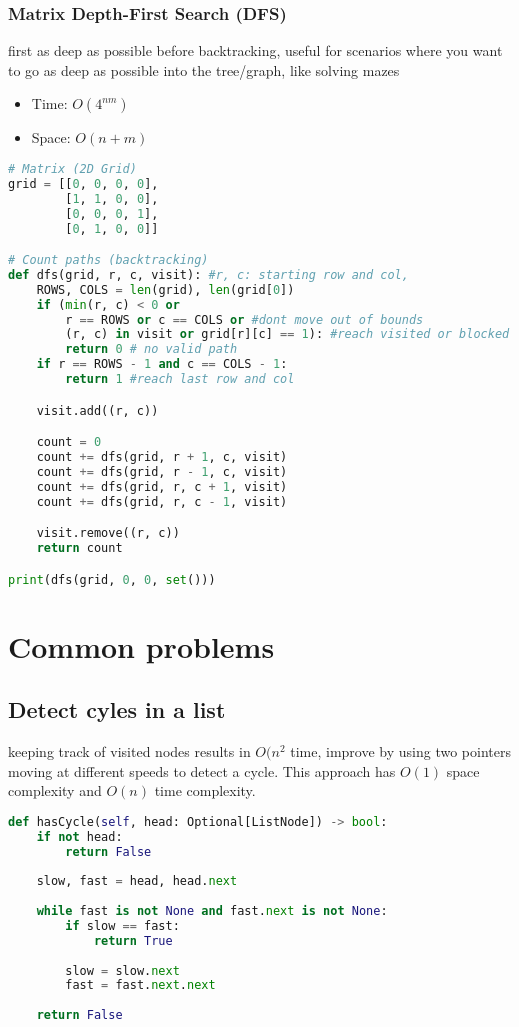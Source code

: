 \documentclass[english, threecolumn]{latex4ei/latex4ei_sheet}
\begin{document}
\begin{sectionbox}
\subsubsection{Matrix Depth-First Search (DFS)}
first as deep as possible before backtracking, useful for scenarios where you want to go as deep as possible into the tree/graph, like solving mazes
\begin{itemize}
    \item Time: $O(4^{nm})$
    \item Space: $O(n+m)$
\end{itemize}
\begin{lstlisting}[language=python, gobble=0]
# Matrix (2D Grid)
grid = [[0, 0, 0, 0],
        [1, 1, 0, 0],
        [0, 0, 0, 1],
        [0, 1, 0, 0]]

# Count paths (backtracking)
def dfs(grid, r, c, visit): #r, c: starting row and col, 
    ROWS, COLS = len(grid), len(grid[0]) 
    if (min(r, c) < 0 or 
        r == ROWS or c == COLS or #dont move out of bounds
        (r, c) in visit or grid[r][c] == 1): #reach visited or blocked position
        return 0 # no valid path
    if r == ROWS - 1 and c == COLS - 1:
        return 1 #reach last row and col

    visit.add((r, c))

    count = 0
    count += dfs(grid, r + 1, c, visit)
    count += dfs(grid, r - 1, c, visit)
    count += dfs(grid, r, c + 1, visit)
    count += dfs(grid, r, c - 1, visit)

    visit.remove((r, c))
    return count

print(dfs(grid, 0, 0, set()))
\end{lstlisting}
\end{sectionbox}


\section{Common problems}
\begin{sectionbox}
\subsection{Detect cyles in a list}
keeping track of visited nodes results in $O(n^2$ time, improve by using two pointers moving at different speeds to detect a cycle. This approach has \(O(1)\) space complexity and \(O(n)\) time complexity.
\begin{lstlisting}[language=python, gobble=0]
def hasCycle(self, head: Optional[ListNode]) -> bool:
    if not head:
        return False
    
    slow, fast = head, head.next
    
    while fast is not None and fast.next is not None:
        if slow == fast:
            return True
        
        slow = slow.next
        fast = fast.next.next
        
    return False
\end{lstlisting}
\end{sectionbox}
\end{document}
